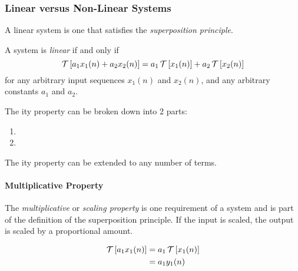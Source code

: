\subsubsection{Linear versus Non-Linear Systems}\label{subsubsec:Linear_vs_Non-Linear_Systems}
A linear system is one that satisfies the \textit{superposition principle}.
\begin{definition}[Linear]\label{def:Linear}
  A system is \emph{linear} if and only if
  \begin{equation}\label{eq:Linear}
    \operatorname{\mathcal{T}} \left[ a_{1}x_{1}(n) + a_{2}x_{2}(n) \right] = a_{1}\operatorname{\mathcal{T}} \left[ x_{1}(n) \right] + a_{2} \operatorname{\mathcal{T}} \left[ x_{2}(n) \right]
  \end{equation}
  for any arbitrary input sequences $x_{1}(n)$ and $x_{2}(n)$, and any arbitrary constants $a_{1}$ and $a_{2}$.

  The ity property can be broken down into 2 parts:
  \begin{enumerate}[noitemsep]
  \item {}
  \item {}
  \end{enumerate}

  \begin{remark}
    The ity property can be extended to any number of terms.
  \end{remark}
\end{definition}

\paragraph{Multiplicative Property}\label{par:Linear-Multiplicative_Property}
\begin{definition}\label{def:Linear-Multiplicative_Property}
  The \emph{multiplicative} or \emph{scaling property} is one requirement of a  system and is part of the definition of the superposition principle.
  If the input is scaled, the output is scaled by a proportional amount.

  \begin{equation}\label{eq:Linear-Multiplicative_Property}
    \begin{aligned}
      \operatorname{\mathcal{T}} \left[ a_{1}x_{1}(n) \right] &= a_{1} \operatorname{\mathcal{T}} \left[ x_{1}(n) \right] \\
      &= a_{1}y_{1}(n) \\
    \end{aligned}
  \end{equation}
\end{definition}


